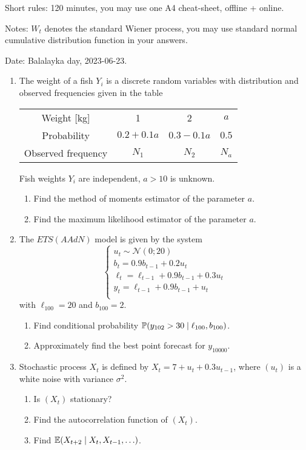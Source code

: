Short rules: 120 minutes, you may use one A4 cheat-sheet, offline +  online.

Notes: $W_t$ denotes the standard Wiener process, 
you may use standard normal cumulative distribution function in your answers.

Date: Balalayka day, 2023-06-23.

\begin{enumerate}

\item The weight of a fish $Y_i$ is a discrete random variables with 
distribution and observed frequencies given in the table 

\begin{tabular}{cccc}
    \toprule
    Weight [kg] & 1 & 2 & $a$ \\
    Probability & $0.2 + 0.1a$ & $0.3 - 0.1a$ & $0.5$ \\
    Observed frequency & $N_1$ & $N_2$ & $N_a$ \\
    \bottomrule
\end{tabular}

Fish weights $Y_i$ are independent, $a > 10$ is unknown. 

\begin{enumerate}
    \item Find the method of moments estimator of the parameter $a$. 
    \item Find the maximum likelihood estimator of the parameter $a$. 
\end{enumerate}


\item The $ETS(AAdN)$ model is given by the system
    \[
    \begin{cases}
    u_t  \sim \mathcal{N}(0;20) \\
    b_t = 0.9 b_{t-1} + 0.2 u_t \\
    \ell_t = \ell_{t-1} + 0.9 b_{t-1} + 0.3 u_t \\
    y_t = \ell_{t-1} + 0.9 b_{t-1} + u_t \\
    \end{cases}
    \]
    with $\ell_{100} = 20$ and $b_{100} = 2$.
\begin{enumerate}
    \item Find conditional probability $\P(y_{102} > 30 \mid \ell_{100}, b_{100})$.
    \item Approximately find the best point forecast for $y_{10000}$.
\end{enumerate}
    
\item Stochastic process $X_t$ is defined by $X_t = 7 + u_t + 0.3 u_{t-1}$, where $(u_t)$ is a white noise 
with variance $\sigma^2$.
\begin{enumerate}
    \item Is $(X_t)$ stationary? 
    \item Find the autocorrelation function of $(X_t)$.
    \item Find $\E(X_{t+2} \mid X_t, X_{t-1}, \ldots)$.
\end{enumerate}


\end{enumerate}
